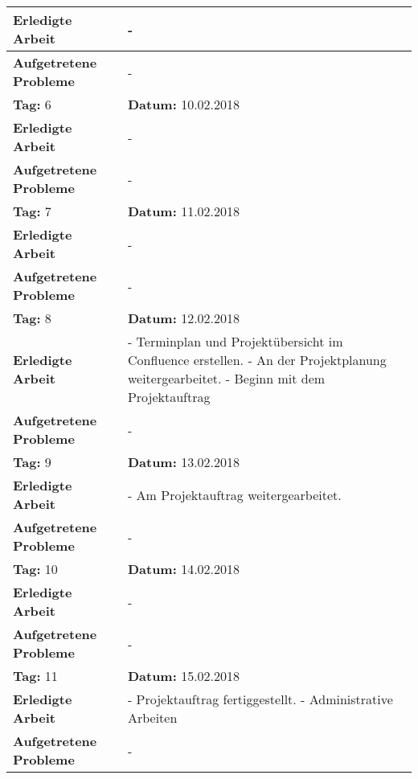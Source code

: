 \begin{longtable}{|p{5cm}|p{5cm}p{6cm}|}
\textbf{Erledigte Arbeit} & \multicolumn{2}{p{11cm}|}{-} \\ \hline
\textbf{Aufgetretene Probleme} & \multicolumn{2}{p{11cm}|}{-} \\ \hline
\rowcolor{heading}\textbf{Tag:} 6 & \textbf{Datum:} 10.02.2018 & \\ \hline
\textbf{Erledigte Arbeit} & \multicolumn{2}{p{11cm}|}{-} \\ \hline
\textbf{Aufgetretene Probleme} & \multicolumn{2}{p{11cm}|}{-} \\ \hline
\rowcolor{heading}\textbf{Tag:} 7 & \textbf{Datum:} 11.02.2018 & \\ \hline
\textbf{Erledigte Arbeit} & \multicolumn{2}{p{11cm}|}{-} \\ \hline
\textbf{Aufgetretene Probleme} & \multicolumn{2}{p{11cm}|}{-} \\ \hline
\rowcolor{heading}\textbf{Tag:} 8 & \textbf{Datum:} 12.02.2018 & \\ \hline
\textbf{Erledigte Arbeit} & \multicolumn{2}{p{11cm}|}{- Terminplan und Projektübersicht im Confluence erstellen. \newline
- An der Projektplanung weitergearbeitet. \newline
- Beginn mit dem Projektauftrag} \\ \hline
\textbf{Aufgetretene Probleme} \newline & \multicolumn{2}{p{11cm}|}{-} \\ \hline
\rowcolor{heading}\textbf{Tag:} 9 & \textbf{Datum:} 13.02.2018 & \\ \hline
\textbf{Erledigte Arbeit} & \multicolumn{2}{p{11cm}|}{- Am Projektauftrag weitergearbeitet.} \\ \hline
\textbf{Aufgetretene Probleme} & \multicolumn{2}{p{11cm}|}{-} \\ \hline
\rowcolor{heading}\textbf{Tag:} 10 & \textbf{Datum:} 14.02.2018 & \\ \hline
\textbf{Erledigte Arbeit} & \multicolumn{2}{p{11cm}|}{-} \\ \hline
\textbf{Aufgetretene Probleme} & \multicolumn{2}{p{11cm}|}{-} \\ \hline
\rowcolor{heading}\textbf{Tag:} 11 & \textbf{Datum:} 15.02.2018 & \\ \hline
\textbf{Erledigte Arbeit} & \multicolumn{2}{p{11cm}|}{- Projektauftrag fertiggestellt. \newline
- Administrative Arbeiten} \\ \hline
\textbf{Aufgetretene Probleme} & \multicolumn{2}{p{11cm}|}{-} \\ \hline

\end{longtable}
